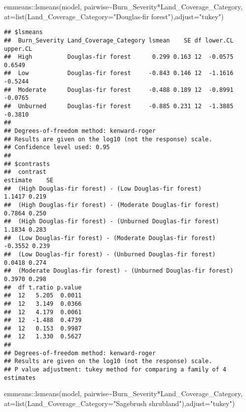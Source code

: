 \documentclass[
]{article}
\newenvironment{Shaded}{\begin{snugshade}}{\end{snugshade}}
\newcommand{\AttributeTok}[1]{\textcolor[rgb]{0.77,0.63,0.00}{#1}}
\newcommand{\FunctionTok}[1]{\textcolor[rgb]{0.00,0.00,0.00}{#1}}
\newcommand{\NormalTok}[1]{#1}
\newcommand{\SpecialCharTok}[1]{\textcolor[rgb]{0.00,0.00,0.00}{#1}}
\newcommand{\StringTok}[1]{\textcolor[rgb]{0.31,0.60,0.02}{#1}}
\begin{document}
\begin{Shaded}
\begin{Highlighting}[]
\NormalTok{emmeans}\SpecialCharTok{::}\FunctionTok{lsmeans}\NormalTok{(model, pairwise}\SpecialCharTok{\textasciitilde{}}\NormalTok{Burn\_Severity}\SpecialCharTok{*}\NormalTok{Land\_Coverage\_Category, }\AttributeTok{at=}\FunctionTok{list}\NormalTok{(}\AttributeTok{Land\_Coverage\_Category=}\StringTok{"Douglas{-}fir forest"}\NormalTok{),}\AttributeTok{adjust=}\StringTok{"tukey"}\NormalTok{)}
\end{Highlighting}
\end{Shaded}

\begin{verbatim}
## $lsmeans
##  Burn_Severity Land_Coverage_Category lsmean    SE df lower.CL upper.CL
##  High          Douglas-fir forest      0.299 0.163 12  -0.0575   0.6549
##  Low           Douglas-fir forest     -0.843 0.146 12  -1.1616  -0.5244
##  Moderate      Douglas-fir forest     -0.488 0.189 12  -0.8991  -0.0765
##  Unburned      Douglas-fir forest     -0.885 0.231 12  -1.3885  -0.3810
## 
## Degrees-of-freedom method: kenward-roger 
## Results are given on the log10 (not the response) scale. 
## Confidence level used: 0.95 
## 
## $contrasts
##  contrast                                                      estimate    SE
##  (High Douglas-fir forest) - (Low Douglas-fir forest)            1.1417 0.219
##  (High Douglas-fir forest) - (Moderate Douglas-fir forest)       0.7864 0.250
##  (High Douglas-fir forest) - (Unburned Douglas-fir forest)       1.1834 0.283
##  (Low Douglas-fir forest) - (Moderate Douglas-fir forest)       -0.3552 0.239
##  (Low Douglas-fir forest) - (Unburned Douglas-fir forest)        0.0418 0.274
##  (Moderate Douglas-fir forest) - (Unburned Douglas-fir forest)   0.3970 0.298
##  df t.ratio p.value
##  12   5.205  0.0011
##  12   3.149  0.0366
##  12   4.179  0.0061
##  12  -1.488  0.4739
##  12   0.153  0.9987
##  12   1.330  0.5627
## 
## Degrees-of-freedom method: kenward-roger 
## Results are given on the log10 (not the response) scale. 
## P value adjustment: tukey method for comparing a family of 4 estimates
\end{verbatim}

\begin{Shaded}
\begin{Highlighting}[]
\NormalTok{emmeans}\SpecialCharTok{::}\FunctionTok{lsmeans}\NormalTok{(model, pairwise}\SpecialCharTok{\textasciitilde{}}\NormalTok{Burn\_Severity}\SpecialCharTok{*}\NormalTok{Land\_Coverage\_Category, }\AttributeTok{at=}\FunctionTok{list}\NormalTok{(}\AttributeTok{Land\_Coverage\_Category=}\StringTok{"Sagebrush shrubland"}\NormalTok{),}\AttributeTok{adjust=}\StringTok{"tukey"}\NormalTok{)}
\end{Highlighting}
\end{Shaded}
\end{document}
